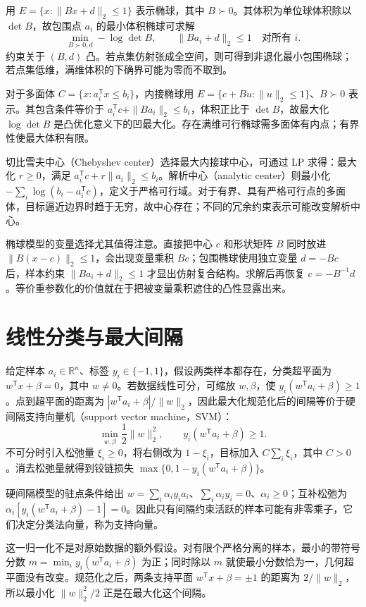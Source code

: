 \documentclass[UTF8,12pt,a4paper,fontset=fandol]{ctexbook}
\begin{document}
用 $E=\{x:\|Bx+d\|_2\leq1\}$ 表示椭球，其中 $B\succ0$。其体积为单位球体积除以 $\det B$，故包围点 $a_i$ 的最小体积椭球可求解
\[
 \min_{B\succ0,d}-\log\det B,
 \qquad \|Ba_i+d\|_2\leq1\quad\text{对所有 }i.
\]
约束关于 $(B,d)$ 凸。若点集仿射张成全空间，则可得到非退化最小包围椭球；若点集低维，满维体积的下确界可能为零而不取到。

对于多面体 $C=\{x:a_i^{\mathsf T}x\leq b_i\}$，内接椭球用 $E=\{c+Bu:\|u\|_2\leq1\}$、$B\succ0$ 表示。其包含条件等价于 $a_i^{\mathsf T}c+\|Ba_i\|_2\leq b_i$，体积正比于 $\det B$，故最大化 $\log\det B$ 是凸优化意义下的凹最大化。存在满维可行椭球需多面体有内点；有界性使最大体积有限。

切比雪夫中心（Chebyshev center）选择最大内接球中心，可通过 LP 求得：最大化 $r\geq0$，满足 $a_i^{\mathsf T}c+r\|a_i\|_2\leq b_i$。解析中心（analytic center）则最小化 $-\sum_i\log(b_i-a_i^{\mathsf T}c)$，定义于严格可行域。对于有界、具有严格可行点的多面体，目标逼近边界时趋于无穷，故中心存在；不同的冗余约束表示可能改变解析中心。

椭球模型的变量选择尤其值得注意。直接把中心 $c$ 和形状矩阵 $B$ 同时放进 $\|B(x-c)\|_2\leq1$，会出现变量乘积 $Bc$；包围椭球使用独立变量 $d=-Bc$ 后，样本约束 $\|Ba_i+d\|_2\leq1$ 才显出仿射复合结构。求解后再恢复 $c=-B^{-1}d$。等价重参数化的价值就在于把被变量乘积遮住的凸性显露出来。

\section{线性分类与最大间隔}

给定样本 $a_i\in\mathbb R^n$、标签 $y_i\in\{-1,1\}$，假设两类样本都存在，分类超平面为 $w^{\mathsf T}x+\beta=0$，其中 $w\ne0$。若数据线性可分，可缩放 $w,\beta$，使 $y_i(w^{\mathsf T}a_i+\beta)\geq1$。点到超平面的距离为 $|w^{\mathsf T}a_i+\beta|/\|w\|_2$，因此最大化规范化后的间隔等价于硬间隔支持向量机（support vector machine，SVM）：
\[
 \min_{w,\beta}\frac12\|w\|_2^2,
 \qquad y_i(w^{\mathsf T}a_i+\beta)\geq1.
\]
不可分时引入松弛量 $\xi_i\geq0$，将右侧改为 $1-\xi_i$，目标加入 $C\sum_i\xi_i$，其中 $C>0$。消去松弛量就得到铰链损失 $\max\{0,1-y_i(w^{\mathsf T}a_i+\beta)\}$。

硬间隔模型的驻点条件给出 $w=\sum_i\alpha_i y_i a_i$、$\sum_i\alpha_i y_i=0$、$\alpha_i\geq0$；互补松弛为 $\alpha_i[y_i(w^{\mathsf T}a_i+\beta)-1]=0$。因此只有间隔约束活跃的样本可能有非零乘子，它们决定分类法向量，称为支持向量。

这一归一化不是对原始数据的额外假设。对有限个严格分离的样本，最小的带符号分数 $m=\min_i y_i(w^{\mathsf T}a_i+\beta)$ 为正；同时除以 $m$ 就使最小分数恰为一，几何超平面没有改变。规范化之后，两条支持平面 $w^{\mathsf T}x+\beta=\pm1$ 的距离为 $2/\|w\|_2$，所以最小化 $\|w\|_2^2/2$ 正是在最大化这个间隔。
\end{document}
